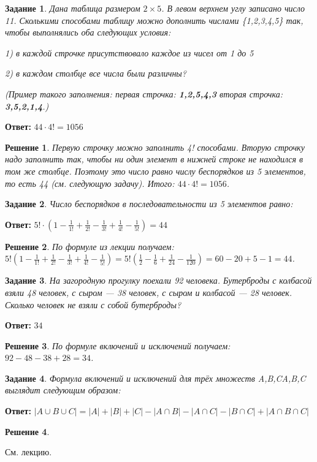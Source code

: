\documentclass[a4paper,oneside]{memoir}
\newtheorem{task}{Задание}
\newtheorem{solution}{Решение}
\begin{document}
\begin{task}
	Дана таблица размером $ 2 \times 5 $. В левом верхнем углу записано число 11. Сколькими способами таблицу можно дополнить числами \{1,2,3,4,5\} так, чтобы выполнялись оба следующих условия:
	
	1) в каждой строчке присутствовало каждое из чисел от 1 до 5
	
	2) в каждом столбце все числа были различны?
	
	(Пример такого заполнения: первая строчка: \textbf{1,2,5,4,3} вторая строчка: \textbf{3,5,2,1,4}.)
\end{task}

\textbf{Ответ:} $ 44 \cdot 4! = 1056 $

\begin{solution}
	Первую строчку можно заполнить 4! способами. Вторую строчку надо заполнить так, чтобы ни один элемент в нижней строке не находился в том же столбце. Поэтому это число равно числу беспорядков из 5 элементов, то есть 44 (см. следующую задачу). Итого: $ 44 \cdot 4! = 1056 $.
\end{solution}

\hrulefill
\begin{task}
	Число беспорядков в последовательности из 5 элементов равно:
\end{task}

\textbf{Ответ:} $ 5! \cdot (1 - \frac{1}{1!} + \frac{1}{2!} - \frac{1}{3!} + \frac{1}{4!} - \frac{1}{5!}) = 44 $

\begin{solution}
	 По формуле из лекции получаем: $ 5! (1 - \frac{1}{1!} + \frac{1}{2!} - \frac{1}{3!} + \frac{1}{4!} - \frac{1}{5!}) = 5! (\frac{1}{2} - \frac{1}{6} + \frac{1}{24} - \frac{1}{120}) = 60 - 20 + 5 - 1 = 44 $.
\end{solution}

\hrulefill
\begin{task}
	На загородную прогулку поехали 92 человека. Бутерброды с колбасой взяли 48 человек, с сыром — 38 человек, с сыром и колбасой — 28 человек. Сколько человек не взяли с собой бутерброды?
\end{task}

\textbf{Ответ:} $ 34 $

\begin{solution}
	По формуле включений и исключений получаем: $ 92-48-38+28 = 34 $.
\end{solution}

\hrulefill
\begin{task}
	Формула включений и исключений для трёх множеств A,B,CA,B,C выглядит следующим образом:
\end{task}

\textbf{Ответ:} $ |A \cup B \cup C| = |A| + |B| + |C| - |A \cap B| - |A \cap C| - |B \cap C| + |A \cap B \cap C| $

\begin{solution}
	
\end{solution}
 См. лекцию.
\end{document}
